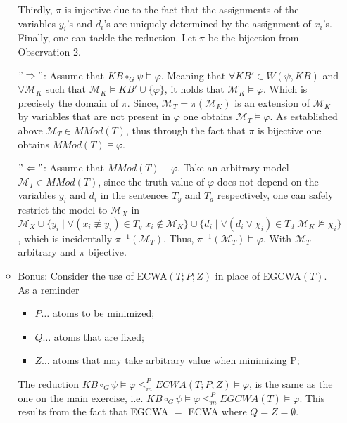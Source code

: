 \documentclass[11pt,a4paper]{article}
\newcommand{\nmodels}{\not\models}
\begin{document}
\begin{enumerate}
\begin{itemize}
Thirdly, $\pi$ is injective due to the fact that the assignments of the variables $y_i$'s and $d_i$'s are uniquely determined by the assignment of $x_i$'s. \\


Finally, one can tackle the reduction. Let $\pi$ be the bijection from Observation 2.

$" \Rightarrow "$: Assume that $\mathit{KB} \circ_G \psi \models \varphi $. Meaning that $\forall \mathit{KB}' \in W(\psi, \mathit{KB})$  and $\forall \mathcal{M}_K$ such that $\mathcal{M}_K \models \mathit{KB}' \cup \{\varphi\}$, it holds that $\mathcal{M}_K \models \varphi$. Which is precisely the domain of $\pi$. Since, $\mathcal{M}_T=\pi(\mathcal{M}_K)$ is an extension of $\mathcal{M}_K$ by variables that are not present in $\varphi$ one obtains $\mathcal{M}_T \models \varphi$. As established above $\mathcal{M}_T \in \mathit{MMod}(T)$, thus through the fact that $\pi$ is bijective one obtains $\mathit{MMod}(T)  \models \varphi$.

$" \Leftarrow "$: Assume that $\mathit{MMod}(T)  \models \varphi$. Take an arbitrary model $\mathcal{M}_T \in \mathit{MMod}(T)$, since the truth value of $\varphi$ does not depend on the variables $y_i$ and $d_i$ in the sentences $T_y$ and $T_d$ respectively, one can safely restrict the model to $\mathcal{M}_X$ in $\mathcal{M}_X \cup \{y_i \mid \forall (x_i \not\equiv y_i) \in T_y \; x_i \notin \mathcal{M}_K\} \cup
 \{ d_i \mid \forall (d_i \lor \chi_i) \in T_d \; \mathcal{M}_K \nmodels \chi_i\}$, which is incidentally $\pi^{-1}(\mathcal{M}_T)$. Thus, $\pi^{-1}(\mathcal{M}_T) \models \varphi$. With $\mathcal{M}_T$ arbitrary and $\pi$ bijective.

\bigskip


\item Bonus: Consider the use of ECWA$(T;P;Z)$ in place of EGCWA$(T)$.\\

As a reminder 
\begin{itemize}
\item $P \dots $ atoms to be minimized;
\item $Q \dots $ atoms that are fixed;
\item $Z \dots $ atoms that may take arbitrary value when minimizing P;

\end{itemize}

The reduction $\mathit{KB} \circ_G \psi \models \varphi     \leq_m^P \mathit{ECWA}(T;P;Z) \models \varphi $, is the same as the one on the main exercise, i.e. $\mathit{KB} \circ_G \psi \models \varphi     \leq_m^P \mathit{EGCWA}(T) \models \varphi$. This results from the fact that EGCWA $=$ ECWA where $Q = Z = \emptyset$. \\


\end{itemize}
\end{enumerate}
\end{document}
